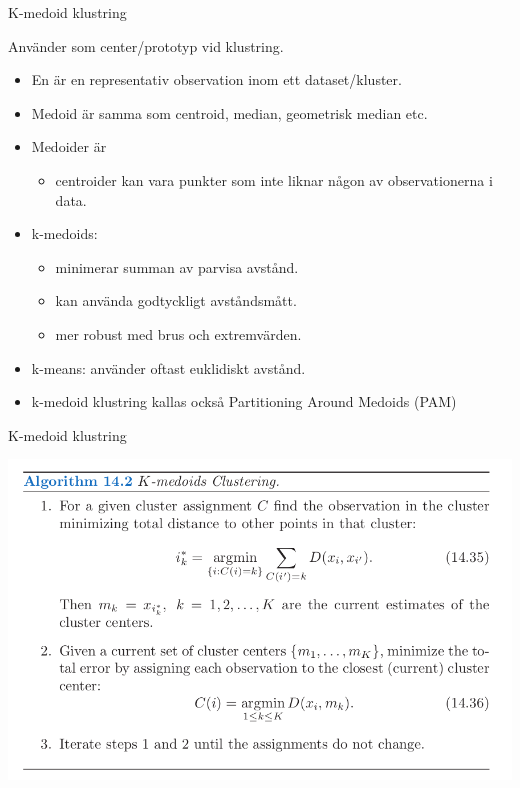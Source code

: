 \documentclass[10pt,english]{beamer}
\begin{document}
\begin{frame}{K-medoid klustring}

    Använder  som center/prototyp vid klustring.
    \begin{itemize}
        \item En  är en representativ observation inom ett dataset/kluster.
        \item Medoid är  samma som centroid, median, geometrisk median etc.
        \item Medoider är 
        \begin{itemize}
            \item centroider kan vara punkter som inte liknar någon av observationerna i data.
        \end{itemize}
        \item k-medoids:
        \begin{itemize}
            \item minimerar summan av parvisa avstånd.
            \item kan använda godtyckligt avståndsmått.
            \item mer robust med brus och extremvärden.
        \end{itemize}
        \item k-means: använder oftast euklidiskt avstånd.
        \item k-medoid klustring kallas också Partitioning Around Medoids (PAM)
    \end{itemize}
    
\end{frame}

\begin{frame}{K-medoid klustring}

    \includegraphics[width = \textwidth]{figs/k-mediod.png}
    
\end{frame}
\end{document}
